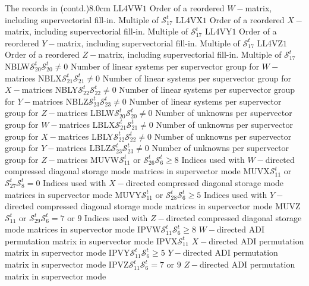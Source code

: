 \begin{DescriptionEnregistrement}{The  records in
 (contd.)}{8.0cm}
\IntEnr
  {LL4VW}{$1$}
  {Order of a reordered $W-$matrix, including supervectorial fill-in. Multiple of $\mathcal{S}^{t}_{17}$}
\IntEnr
  {LL4VX}{$1$}
  {Order of a reordered $X-$matrix, including supervectorial fill-in. Multiple of $\mathcal{S}^{t}_{17}$}
\IntEnr
  {LL4VY}{$1$}
  {Order of a reordered $Y-$matrix, including supervectorial fill-in. Multiple of $\mathcal{S}^{t}_{17}$}
\IntEnr
  {LL4VZ}{$1$}
  {Order of a reordered $Z-$matrix, including supervectorial fill-in. Multiple of $\mathcal{S}^{t}_{17}$}
\OptIntEnr
  {NBLW}{$\mathcal{S}^{t}_{20}$}{$\mathcal{S}^{t}_{20}\ne 0$}
  {Number of linear systems per supervector group for $W-$matrices}
\OptIntEnr
  {NBLX}{$\mathcal{S}^{t}_{21}$}{$\mathcal{S}^{t}_{21}\ne 0$}
  {Number of linear systems per supervector group for $X-$matrices}
\OptIntEnr
  {NBLY}{$\mathcal{S}^{t}_{22}$}{$\mathcal{S}^{t}_{22}\ne 0$}
  {Number of linear systems per supervector group for $Y-$matrices}
\OptIntEnr
  {NBLZ}{$\mathcal{S}^{t}_{23}$}{$\mathcal{S}^{t}_{23}\ne 0$}
  {Number of linear systems per supervector group for $Z-$matrices}
\OptIntEnr
  {LBLW}{$\mathcal{S}^{t}_{20}$}{$\mathcal{S}^{t}_{20}\ne 0$}
  {Number of unknowns per supervector group for $W-$matrices}
\OptIntEnr
  {LBLX}{$\mathcal{S}^{t}_{21}$}{$\mathcal{S}^{t}_{21}\ne 0$}
  {Number of unknowns per supervector group for $X-$matrices}
\OptIntEnr
  {LBLY}{$\mathcal{S}^{t}_{22}$}{$\mathcal{S}^{t}_{22}\ne 0$}
  {Number of unknowns per supervector group for $Y-$matrices}
\OptIntEnr
  {LBLZ}{$\mathcal{S}^{t}_{23}$}{$\mathcal{S}^{t}_{23}\ne 0$}
  {Number of unknowns per supervector group for $Z-$matrices}
\OptIntEnr
  {MUVW}{$\mathcal{S}^{t}_{11}$ or $\mathcal{S}^{t}_{26}$}{$\mathcal{S}^{t}_{6}\ge 8$}
  {Indices used with $W-$directed compressed diagonal storage mode matrices in supervector mode}
\OptIntEnr
  {MUVX}{$\mathcal{S}^{t}_{11}$ or $\mathcal{S}^{t}_{27}$}{$\mathcal{S}^{t}_{8}=0$}
  {Indices used with $X-$directed compressed diagonal storage mode matrices in supervector mode}
\OptIntEnr
  {MUVY}{$\mathcal{S}^{t}_{11}$ or $\mathcal{S}^{t}_{28}$}{$\mathcal{S}^{t}_{6}\ge 5$}
  {Indices used with $Y-$directed compressed diagonal storage mode matrices in supervector mode}
\OptIntEnr
  {MUVZ}{$\mathcal{S}^{t}_{11}$ or $\mathcal{S}^{t}_{29}$}{$\mathcal{S}^{t}_{6}=7$ or $9$}
  {Indices used with $Z-$directed compressed diagonal storage mode matrices in supervector mode}
\OptIntEnr
  {IPVW}{$\mathcal{S}^{t}_{11}$}{$\mathcal{S}^{t}_{6}\ge 8$}
  {$W-$directed ADI permutation matrix in supervector mode}
\IntEnr
  {IPVX}{$\mathcal{S}^{t}_{11}$}
  {$X-$directed ADI permutation matrix in supervector mode}
\OptIntEnr
  {IPVY}{$\mathcal{S}^{t}_{11}$}{$\mathcal{S}^{t}_{6}\ge 5$}
  {$Y-$directed ADI permutation matrix in supervector mode}
\OptIntEnr
  {IPVZ}{$\mathcal{S}^{t}_{11}$}{$\mathcal{S}^{t}_{6}=7$ or $9$}
  {$Z-$directed ADI permutation matrix in supervector mode}
\end{DescriptionEnregistrement}

